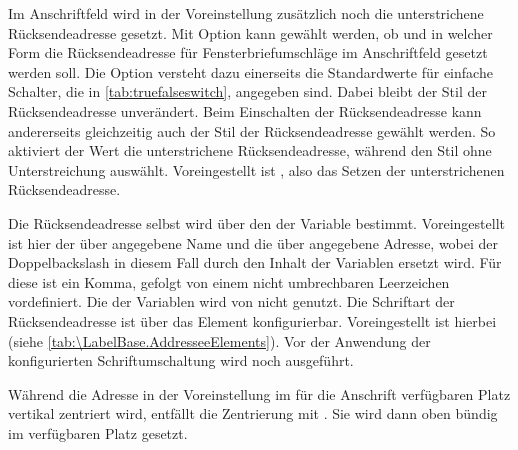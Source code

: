 Im Anschriftfeld wird in der Voreinstellung 
zusätzlich noch die unterstrichene Rücksendeadresse gesetzt.  Mit Option
 kann gewählt werden, ob und in welcher Form die
Rücksendeadresse für
Fensterbriefumschläge im Anschriftfeld gesetzt werden soll.  Die
Option versteht dazu einerseits
die Standardwerte für einfache Schalter, die in \autoref{tab:truefalseswitch},
 angegeben sind. Dabei bleibt der Stil der
Rücksendeadresse unverändert. Beim Einschalten der Rücksendeadresse kann
andererseits gleichzeitig auch der Stil der
Rücksendeadresse gewählt werden. So aktiviert der Wert
 die
unterstrichene Rücksendeadresse, während
 den Stil ohne
Unterstreichung auswählt. Voreingestellt ist
, also das Setzen der unterstrichenen Rücksendeadresse.

Die Rücksendeadresse selbst wird über den  der Variable
 bestimmt. Voreingestellt ist hier der über
 angegebene Name und die über
 angegebene Adresse, wobei der
Doppelbackslash in diesem Fall durch den Inhalt der Variablen
 ersetzt wird. Für diese ist ein Komma, gefolgt
von einem nicht umbrechbaren Leerzeichen vordefiniert. Die 
der Variablen  wird von \KOMAScript{} nicht genutzt.
\BeginIndexGroup{}%
%
Die Schriftart der Rücksendeadresse ist über das Element
konfigurierbar. Voreingestellt ist hierbei
%
 (siehe
\autoref{tab:\LabelBase.AddresseeElements}). Vor der Anwendung der
konfigurierten Schriftumschaltung wird noch  ausgeführt.%
\EndIndexGroup

Während die Adresse in der Voreinstellung
 im für die Anschrift verfügbaren Platz vertikal
zentriert wird, entfällt die Zentrierung mit
%
. Sie wird dann oben bündig im
verfügbaren Platz gesetzt.

